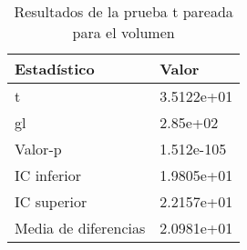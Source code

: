 \begin{table}[ht]
\centering
\caption{Resultados de la prueba t pareada para el volumen} 
\label{tab:prueba_t_volumen}
\begin{tabular}{ll}
  \hline
Estadístico & Valor \\ 
  \hline
t & 3.5122e+01 \\ 
  gl & 2.85e+02 \\ 
  Valor-p & 1.512e-105 \\ 
  IC inferior & 1.9805e+01 \\ 
  IC superior & 2.2157e+01 \\ 
  Media de diferencias & 2.0981e+01 \\ 
   \hline
\end{tabular}
\end{table}
